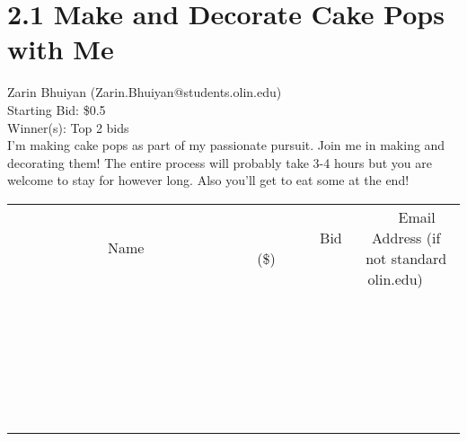 \documentclass[11pt]{article}
\begin{document}
\section*{2.1 Make and Decorate Cake Pops with Me}
Zarin Bhuiyan (Zarin.Bhuiyan@students.olin.edu) \\
Starting Bid: \$0.5 \\
Winner(s): 
Top 2 bids \\
I'm making cake pops as part of my passionate pursuit. Join me in making and decorating them! The entire process will probably take 3-4 hours but you are welcome to stay for however long. Also you'll get to eat some at the end! \\[6ex]
\begin{tabular}{c c c}
~~~~~~~~~~~~~Name~~~~~~~~~~~~~ & ~~~~~~~~~Bid (\$)~~~~~~~~~ & ~~~Email Address (if not standard olin.edu)~~~ \\
 & & \\
\hline
 & & \\
\hline
 & & \\
\hline
 & & \\
\hline
 & & \\
\hline
 & & \\
\hline
 & & \\
\hline
 & & \\
\hline
 & & \\
\hline
 & & \\
\hline
 & & \\
\hline
 & & \\
\hline
 & & \\
\hline
 & & \\
\hline
 & & \\
\hline
 & & \\
\hline
 & & \\
\hline
 & & \\
\hline
 & & \\
\hline
 & & \\
\hline
 & & \\
\hline
 & & \\
\hline
 & & \\
\hline
 & & \\
\hline
 & & \\
\hline
 & & \\
\hline
\end{tabular}
\clearpage
\end{document}
